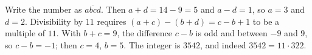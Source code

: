 Write the number as $\overline{abcd}$. Then $a+d=14-9=5$ and $a-d=1$, so $a=3$ and $d=2$. Divisibility by $11$ requires $(a+c)-(b+d)=c-b+1$ to be a multiple of $11$. With $b+c=9$, the difference $c-b$ is odd and between $-9$ and $9$, so $c-b=-1$; then $c=4$, $b=5$. The integer is $\boxed{3542}$, and indeed $3542=11\cdot322$.
